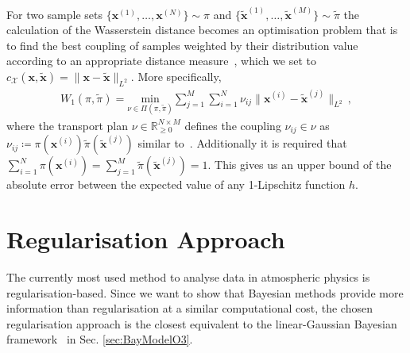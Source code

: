 For two sample sets $\{ \bm{x}^{(1)},\dots,\bm{x}^{(N)}\} \sim \pi$ and $\{\tilde{ \bm{x}}^{(1)},\dots,\tilde{\bm{x}}^{(M)}\} \sim \tilde{\pi}$ the calculation of the Wasserstein distance becomes an optimisation problem that is to find the best coupling of samples weighted by their distribution value according to an appropriate distance measure~\cite{feydy2020OT}, which we set to $c_{\mathcal{X}}(\bm{x},\tilde{\bm{x}})= \lVert \bm{x} -\tilde{\bm{x}} \rVert_{L^2} $.
More specifically,
\begin{align}
	W_1(\pi,\tilde{\pi}) = 	\underset{\nu \in \Pi(\pi,\tilde{\pi}) }{\text{min}} \sum^M_{j = 1} \sum^N_{i =1}  \nu_{ij} \lVert\bm{x}^{(i)}  -  \tilde{\bm{x}}^{(j)} \rVert_{L^2} \, , \label{eq:applWasser}
\end{align}
where the transport plan $\nu \in \mathbb{R}^{N \times M}_ {\geq 0}$ defines the coupling $\nu_{ij} \in \nu $ as $ \nu_{ij} \coloneqq \pi(\bm{x}^{(i)}) \tilde{\pi}(\tilde{\bm{x}}^{(j)})$ similar to~\cite[Eq. 3.166]{feydy2020OT}.
Additionally it is required that $\sum^N_{i =1} \pi(\bm{x}^{(i)}) = \sum^M_{j = 1} \tilde{\pi}(\tilde{\bm{x}}^{(j)})= 1 $.
This gives us an upper bound of the absolute error between the expected value of any 1-Lipschitz function $h$.


\clearpage
\section{Regularisation Approach}
\label{sec:reg}

The currently most used method to analyse data in atmospheric physics is regularisation-based.
Since we want to show that Bayesian methods provide more information than regularisation at a similar computational cost, the chosen regularisation approach is the closest equivalent to the linear-Gaussian Bayesian framework~\cite{fox2016fast} in Sec. \ref{sec:BayModelO3}.

